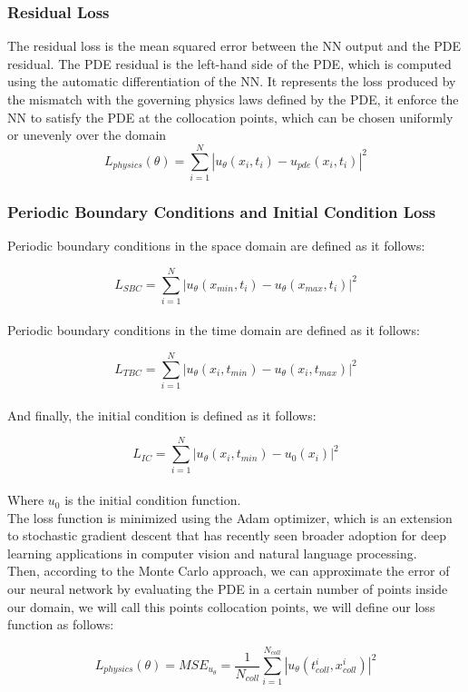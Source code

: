 \documentclass{article}
\begin{document}
\subsubsection*{Residual Loss}

The residual loss is the mean squared error between the NN output and the PDE residual. The PDE residual is the left-hand side of the PDE, which is computed using the automatic differentiation of the NN.
It represents the loss produced by the mismatch with the governing physics laws defined by the PDE, it enforce the NN to satisfy the PDE at the collocation points, which can be chosen uniformly or unevenly over the domain
$$
L_{physics}(\theta) = \sum_{i=1}^{N} |u_\theta(x_i,t_i) - u_{pde}(x_i,t_i)|^2
$$

\subsubsection*{Periodic Boundary Conditions and Initial Condition Loss}

Periodic boundary conditions in the space domain are defined as it follows:

$$
L_{SBC} = \sum_{i=1}^{N} |u_\theta(x_{min},t_i) - u_\theta(x_{max},t_i)|^2
$$
\\
Periodic boundary conditions in the time domain are defined as it follows:

$$
L_{TBC} = \sum_{i=1}^{N} |u_\theta(x_i,t_{min}) - u_\theta(x_i,t_{max})|^2
$$
\\
And finally, the initial condition is defined as it follows:

$$
L_{IC} = \sum_{i=1}^{N} |u_\theta(x_i,t_{min}) - u_{0}(x_i)|^2
$$
\\
Where $u_0$ is the initial condition function.\\

The loss function is minimized using the Adam optimizer, which is an extension to stochastic gradient descent that has recently seen broader adoption for deep learning applications in computer vision and natural language processing.\\

Then, according to the Monte Carlo approach, we can approximate the error of our neural network by evaluating the PDE in a certain number of points inside our domain, we will call this points collocation points, we will define our loss function as follows:

$$
 L_{physics}(\theta) = MSE_{u_\theta}=\frac{1}{N_{coll}}\sum^{N_{coll}}_{i=1}|u_\theta(t_{coll}^i,x_{coll}^i)|^2
$$
\end{document}
